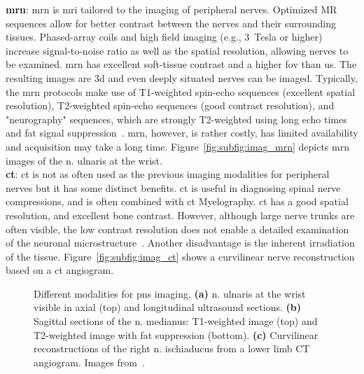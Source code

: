 \textbf{\gls{mrn}}: \gls{mrn} is \gls{mri} tailored to the imaging of peripheral nerves. Optimized MR sequences allow for better contrast between the nerves and their surrounding tissues. Phased-array coils and high field imaging (e.g., 3~Tesla or higher) increase signal-to-noise ratio as well as the spatial resolution, allowing nerves to be examined. \gls{mrn} has excellent soft-tissue contrast and a higher \gls{fov} than \gls{us}. The resulting images are \gls{3d} and even deeply situated nerves can be imaged. Typically, the \gls{mrn} protocols make use of T1-weighted spin-echo sequences (excellent spatial resolution), T2-weighted spin-echo sequences (good contrast resolution), and "neurography" sequences, which are strongly T2-weighted using long echo times and fat signal suppression~\cite{Ohana2014CurrentSystem}. \gls{mrn}, however, is rather costly, has limited availability and acquisition may take a long time. Figure~\ref{fig:subfig:imag_mrn} depicts \gls{mrn} images of the \gls{n.} ulnaris at the wrist.\\

\textbf{\gls{ct}}: \gls{ct} is not as often used as the previous imaging modalities for peripheral nerves but it has some distinct benefits. \gls{ct} is useful in diagnosing spinal nerve compressions, and is often combined with \gls{ct} Myelography. \gls{ct} has a good spatial resolution, and excellent bone contrast. However, although large nerve trunks are often visible, the low contrast resolution does not enable a detailed examination of the neuronal microstructure~\cite{Ohana2014CurrentSystem}. Another disadvantage is the inherent irradiation of the tissue. Figure~\ref{fig:subfig:imag_ct} shows a curvilinear nerve reconstruction based on a \gls{ct} angiogram.\\


\begin{figure}[htbp]
	\centering
	\hfill
	\hfill
	\caption[Modalities for Imaging of the Peripheral Nervous System]{Different modalities for \acrlong{pns} imaging. \textbf{(a)} \gls{n.} ulnaris at the wrist visible in axial (top) and longitudinal ultrasound sections. \textbf{(b)} Sagittal sections of the \gls{n.} medianus: T1-weighted image (top) and T2-weighted image with fat suppression (bottom). \textbf{(c)} Curvilinear reconstructions of the right \gls{n.} ischiaducus from a lower limb CT angiogram. Images from~\cite{Mohassel2015}.}
	\label{fig:imag_modalities}  
\end{figure}

